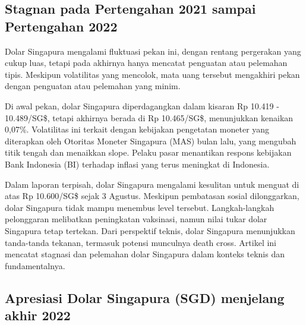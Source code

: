 \documentclass[12pt]{article}
\begin{document}
\subsection*{Stagnan pada Pertengahan 2021 sampai Pertengahan 2022}

Dolar Singapura mengalami fluktuasi pekan ini, dengan rentang pergerakan yang cukup luas, tetapi pada akhirnya hanya mencatat penguatan atau pelemahan tipis. Meskipun volatilitas yang mencolok, mata uang tersebut mengakhiri pekan dengan penguatan atau pelemahan yang minim.

Di awal pekan, dolar Singapura diperdagangkan dalam kisaran Rp 10.419 - 10.489/SG\$, tetapi akhirnya berada di Rp 10.465/SG\$, menunjukkan kenaikan 0,07\%. Volatilitas ini terkait dengan kebijakan pengetatan moneter yang diterapkan oleh Otoritas Moneter Singapura (MAS) bulan lalu, yang mengubah titik tengah dan menaikkan slope. Pelaku pasar menantikan respons kebijakan Bank Indonesia (BI) terhadap inflasi yang terus meningkat di Indonesia.\autocite{Putu_Agus_Pransuamitra_2021_APRIL_cnbcindonesia}

Dalam laporan terpisah, dolar Singapura mengalami kesulitan untuk menguat di atas Rp 10.600/SG\$ sejak 3 Agustus. Meskipun pembatasan sosial dilonggarkan, dolar Singapura tidak mampu menembus level tersebut. Langkah-langkah pelonggaran melibatkan peningkatan vaksinasi, namun nilai tukar dolar Singapura tetap tertekan. Dari perspektif teknis, dolar Singapura menunjukkan tanda-tanda tekanan, termasuk potensi munculnya death cross. Artikel ini mencatat stagnasi dan pelemahan dolar Singapura dalam konteks teknis dan fundamentalnya.\autocite{Putu_Agus_Pransuamitra_2022_AUG_cnbcindonesia}



\subsection*{Apresiasi Dolar Singapura (SGD) menjelang akhir 2022}
\end{document}
